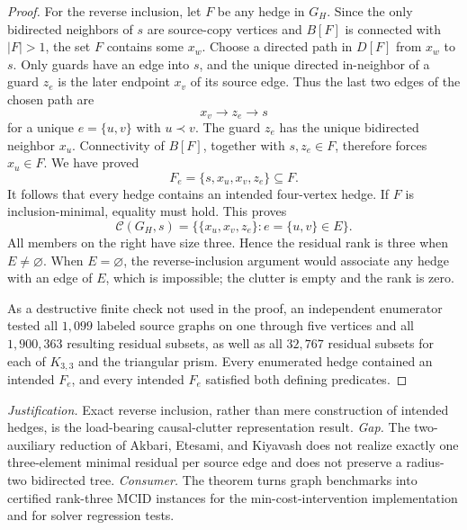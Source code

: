 \documentclass{article}
\begin{document}
\begin{proof}
For the reverse inclusion, let \(F\) be any hedge in \(G_H\).  Since the
only bidirected neighbors of \(s\) are source-copy vertices and \(B[F]\) is
connected with \(|F|>1\), the set \(F\) contains some \(x_w\).  Choose a
directed path in \(D[F]\) from \(x_w\) to \(s\).  Only guards have an edge
into \(s\), and the unique directed in-neighbor of a guard \(z_e\) is the
later endpoint \(x_v\) of its source edge.  Thus the last two edges of the
chosen path are
\[
 x_v\longrightarrow z_e\longrightarrow s
\]
for a unique \(e=\{u,v\}\) with \(u\prec v\).  The guard \(z_e\) has the
unique bidirected neighbor \(x_u\).  Connectivity of \(B[F]\), together
with \(s,z_e\in F\), therefore forces \(x_u\in F\).  We have proved
\[
 F_e=\{s,x_u,x_v,z_e\}\subseteq F.
\]
It follows that every hedge contains an intended four-vertex hedge.  If
\(F\) is inclusion-minimal, equality must hold.  This proves
\[
 \mathcal C(G_H,s)
 =\bigl\{\{x_u,x_v,z_e\}:e=\{u,v\}\in E\bigr\}.
\]
All members on the right have size three.  Hence the residual rank is three
when \(E\neq\varnothing\).  When \(E=\varnothing\), the reverse-inclusion
argument would associate any hedge with an edge of \(E\), which is
impossible; the clutter is empty and the rank is zero.

As a destructive finite check not used in the proof, an independent
enumerator tested all \(1{,}099\) labeled source graphs on one through five
vertices and all \(1{,}900{,}363\) resulting residual subsets, as well as
all \(32{,}767\) residual subsets for each of \(K_{3,3}\) and the triangular
prism.  Every enumerated hedge contained an intended \(F_e\), and every
intended \(F_e\) satisfied both defining predicates.
\end{proof}
\par\smallskip\noindent \textit{Justification.} Exact reverse inclusion, rather than mere construction of intended hedges, is the load-bearing causal-clutter representation result. \textit{Gap.} The two-auxiliary reduction of Akbari, Etesami, and Kiyavash does not realize exactly one three-element minimal residual per source edge and does not preserve a radius-two bidirected tree. \textit{Consumer.} The theorem turns graph benchmarks into certified rank-three MCID instances for the min-cost-intervention implementation and for solver regression tests.
\end{document}

